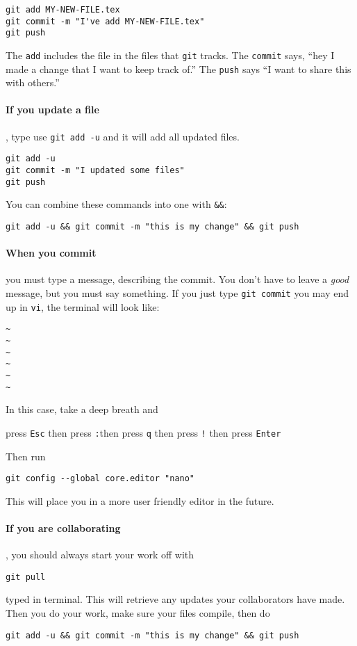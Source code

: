 \documentclass{ximera}
\begin{document}
\begin{verbatim}
git add MY-NEW-FILE.tex
git commit -m "I've add MY-NEW-FILE.tex"
git push
\end{verbatim}
The \verb!add! includes the file in the files that \verb!git! tracks. The
\verb!commit! says, ``hey I made a change that I want to keep track of.'' The
\verb!push! says ``I want to share this with others.''

\paragraph{If you update a file},
type use \verb!git add -u! and it will add all updated files.
\begin{verbatim}
git add -u
git commit -m "I updated some files"
git push
\end{verbatim}
You can combine these commands into one with \verb!&&!:
\begin{verbatim}
git add -u && git commit -m "this is my change" && git push
\end{verbatim}

\paragraph{When you commit} you must type a message, describing the commit. You
don't have to leave a \textit{good} message, but you must say something.
If you just type \verb!git commit! you may end up in \verb!vi!, the terminal
will look like:
\begin{verbatim}
~
~
~
~
~
~
\end{verbatim}
In this case, take a deep breath and
\begin{center}
      press \verb!Esc! \quad then press \verb!:!\quad then press \verb!q! \quad
      then
      press \verb#!# \quad then press \verb!Enter!
\end{center}
Then run
\begin{verbatim}
git config --global core.editor "nano"
\end{verbatim}
This will place you in a more user friendly editor in the future.

\paragraph{If you are collaborating}, you should always start your work off
with
\begin{verbatim}
git pull
\end{verbatim}
typed in terminal. This will retrieve any updates your collaborators have made.
Then you do your work, make sure your files compile, then do
\begin{verbatim}
git add -u && git commit -m "this is my change" && git push
\end{verbatim}
\end{document}
